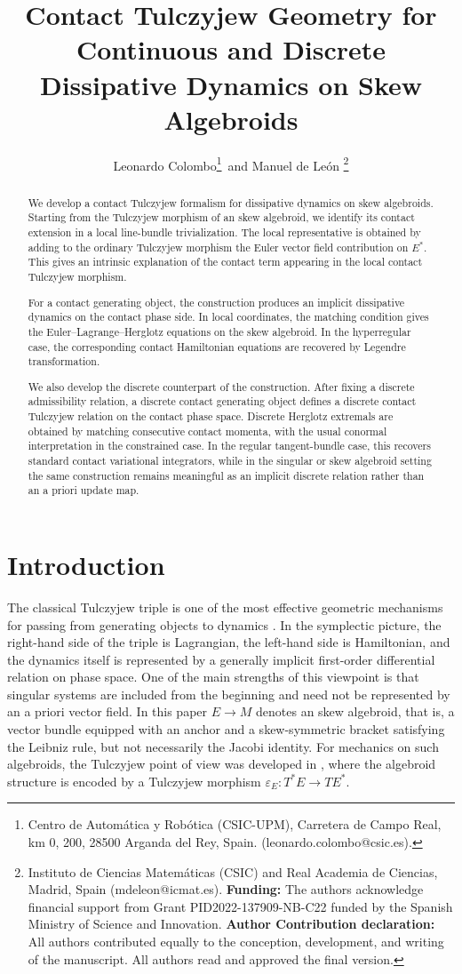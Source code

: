 \documentclass[11pt]{article}
\title{Contact Tulczyjew Geometry for Continuous and Discrete Dissipative Dynamics on Skew Algebroids}
\author{Leonardo Colombo\thanks{Centro de Automática y Robótica (CSIC-UPM), Carretera de Campo Real, km 0, 200, 28500 Arganda del Rey, Spain. (leonardo.colombo@csic.es).}\, and Manuel de Le\'on \thanks{Instituto de Ciencias Matemáticas (CSIC) and Real Academia de Ciencias, Madrid, Spain (mdeleon@icmat.es). \textbf{Funding:} The authors acknowledge financial support from Grant PID2022-137909-NB-C22 funded by the Spanish Ministry of Science and Innovation. \textbf{Author Contribution declaration:} All authors contributed equally to the conception, development, and writing of the manuscript. All authors read and approved the final version.}}
\date{\empty}
\begin{document}
\maketitle

\begin{abstract}
We develop a contact Tulczyjew formalism for dissipative dynamics on skew
algebroids. Starting from the Tulczyjew morphism of an skew algebroid, we
identify its contact extension in a local line-bundle trivialization. The local
representative is obtained by adding to the ordinary Tulczyjew morphism the
Euler vector field contribution on \(E^*\). This gives an intrinsic explanation
of the contact term appearing in the local contact Tulczyjew morphism.

For a contact generating object, the construction produces an implicit
dissipative dynamics on the contact phase side. In local coordinates, the
matching condition gives the Euler--Lagrange--Herglotz equations on the skew
algebroid. In the hyperregular case, the corresponding contact Hamiltonian
equations are recovered by Legendre transformation.

We also develop the discrete counterpart of the construction. After fixing a
discrete admissibility relation, a discrete contact generating object defines a
discrete contact Tulczyjew relation on the contact phase space. Discrete
Herglotz extremals are obtained by matching consecutive contact momenta, with
the usual conormal interpretation in the constrained case. In the regular
tangent-bundle case, this recovers standard contact variational integrators,
while in the singular or skew algebroid setting the same construction remains
meaningful as an implicit discrete relation rather than an a priori update map. 
\end{abstract}

\section{Introduction}

The classical Tulczyjew triple is one of the most effective geometric mechanisms
for passing from generating objects to dynamics \cite{Tulczyjew1976}. In the
symplectic picture, the right-hand side of the triple is Lagrangian, the left-hand
side is Hamiltonian, and the dynamics itself is represented by a generally implicit
first-order differential relation on phase space. One of the main strengths
of this viewpoint is that singular systems are included from the beginning and need
not be represented by an a priori vector field. In this paper $E\to M$ denotes
an skew algebroid, that is, a vector bundle equipped with an anchor and a
skew-symmetric bracket satisfying the Leibniz rule, but not necessarily the Jacobi
identity. For mechanics on such algebroids, the Tulczyjew point of view was
developed in \cite{GG2008}, where the algebroid structure is
encoded by a Tulczyjew morphism
$\varepsilon_E:T^*E\to TE^{*}$.
\end{document}
